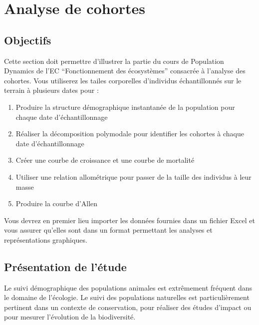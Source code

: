 \documentclass[
  a4paper,
  DIV=11,
  numbers=noendperiod,
  oneside]{scrreprt}
\providecommand{\tightlist}{%
  \setlength{\itemsep}{0pt}\setlength{\parskip}{0pt}}\usepackage{longtable,booktabs,array}
\begin{document}

\hypertarget{sec-cohortes}{%
\chapter{Analyse de cohortes}\label{sec-cohortes}}

\hypertarget{objectifs-1}{%
\section{Objectifs}\label{objectifs-1}}

Cette section doit permettre d'illustrer la partie du cours de
Population Dynamics de l'EC ``Fonctionnement des écosystèmes'' consacrée
à l'analyse des cohortes. Vous utiliserez les tailes corporelles
d'individus échantillonnés sur le terrain à plusieurs dates pour :

\begin{enumerate}
\def\labelenumi{\arabic{enumi}.}
\tightlist
\item
  Produire la structure démographique instantanée de la population pour
  chaque date d'échantillonnage
\item
  Réaliser la décomposition polymodale pour identifier les cohortes à
  chaque date d'échantillonnage
\item
  Créer une courbe de croissance et une courbe de mortalité
\item
  Utiliser une relation allométrique pour passer de la taille des
  individus à leur masse
\item
  Produire la courbe d'Allen
\end{enumerate}

Vous devrez en premier lieu importer les données fournies dans un
fichier Excel et vous assurer qu'elles sont dans un format permettant
les analyses et représentations graphiques.

\hypertarget{sec-pres}{%
\section{Présentation de l'étude}\label{sec-pres}}

Le suivi démographique des populations animales est extrêmement fréquent
dans le domaine de l'écologie. Le suivi des populations naturelles est
particulièrement pertinent dans un contexte de conservation, pour
réaliser des études d'impact ou pour mesurer l'évolution de la
biodiversité.
\end{document}
